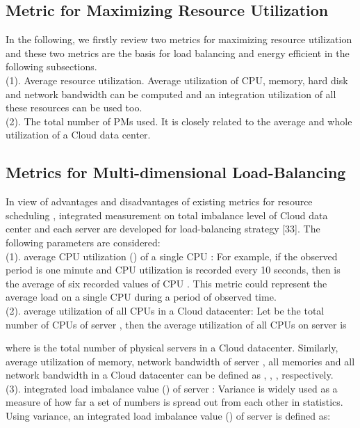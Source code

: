 \documentclass[3p, twocolumn]{elsarticle}
\begin{document}
\subsection{Metric for Maximizing Resource Utilization}
In the following, we firstly review two metrics for maximizing resource utilization and these two metrics are the basis for load balancing and energy efficient in the following subsections.\\
\noindent (1). Average resource utilization. Average utilization of CPU, memory, hard disk and network bandwidth can be computed and an integration utilization of all these resources can be used too. \\
(2). The total number of PMs used. It is closely related to the average and whole utilization of a Cloud data center.\\

\subsection{Metrics for Multi-dimensional Load-Balancing}

In view of advantages and disadvantages of existing metrics for resource scheduling \cite{IEEEhowto:Singh}\cite{IEEEhowto:Wood}\cite{IEEEhowto:Zheng}\cite{IEEEhowto:Tian2}, integrated measurement on total imbalance level of Cloud data center and each server are developed for load-balancing strategy [33]. The following parameters are considered:\\
(1). average CPU utilization () of a single CPU : For example, if the observed period is one minute and CPU utilization is recorded every 10 seconds, then  is the average of six recorded values of CPU . This metric could represent the average load on a single CPU during a period of observed time.\\
(2). average utilization of all CPUs in a Cloud datacenter: Let  be the total number of CPUs of server , then the average utilization of all CPUs on server  is

where  is the total number of physical servers in a Cloud datacenter. Similarly, average utilization of memory, network bandwidth of server , all memories and all network bandwidth in a Cloud datacenter can be defined as , , ,  respectively.\\
(3). integrated load imbalance value () of server : Variance is widely used as a measure of how far a set of numbers is spread out from each other in statistics. Using variance, an integrated load imbalance value () of server  is defined as:
\end{document}
